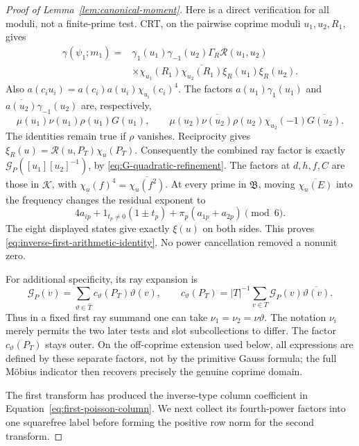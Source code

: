 \documentclass[12pt]{article}
\begin{document}
\begin{proof}[Proof of Lemma~\ref{lem:canonical-moment}]
Here is a direct verification for all moduli, not a finite-prime test.
CRT, on the pairwise coprime moduli \(u_1,u_2,R_1\), gives
\[
\begin{split}
 \gamma(\psi_1;m_1)
 ={}&\gamma_1(u_1)\gamma_{-1}(u_2)\Gamma_R
       \mathcal R(u_1,u_2)\\
 &\times\chi_{u_1}(R_1)\overline{\chi_{u_2}(R_1)}
             \xi_R(u_1)\xi_R(u_2).
\end{split}
\]
Also
\(a(c_i u_i)=a(c_i)a(u_i)\chi_{u_i}(c_i)^4\).
The factors
\(a(u_1)\gamma_1(u_1)\) and
\(\overline{a(u_2)}\gamma_{-1}(u_2)\) are, respectively,
\[
 \mu(u_1)\nu(u_1)\rho(u_1)G(u_1),\qquad
 \mu(u_2)\overline{\nu(u_2)}\rho(u_2)
                \chi_{u_2}(-1)\overline{G(u_2)}.
\]
The identities remain true if \(\rho\) vanishes.
Reciprocity gives
\(\xi_R(u)=\mathcal R(u,P_T)\chi_u(P_T)\).
Consequently the combined ray factor is exactly
\(\mathcal G_P([u_1][u_2]^{-1})\), by
\eqref{eq:G-quadratic-refinement}.
The factors at \(d,h,f,C\) are those in \(\mathcal K\), with
\(\chi_u(f)^4=\overline{\chi_u(f^2)}\).
At every prime in \(\mathfrak B\), moving
\(\overline{\chi_u(E)}\) into the frequency changes the residual
exponent to
\[
 4a_{ip}+1_{t_p\ne0}(1\mathbin{\pm}t_p)
                       +\pi_p(a_{1p}+a_{2p})\pmod6.
\]
The eight displayed states give exactly \(\xi(u)\) on both sides.
This proves \eqref{eq:inverse-first-arithmetic-identity}.
No power cancellation removed a nonunit zero.

For additional specificity, its ray expansion is
\[
 \mathcal G_P(v)=\sum_{\vartheta\in\widehat T}
          c_\vartheta(P_T)\vartheta(v),\qquad
 c_\vartheta(P_T)=|T|^{-1}\sum_{v\in T}
                 \mathcal G_P(v)\overline{\vartheta(v)} .
\]
Thus in a fixed first ray summand one can take
\(\nu_1=\nu_2=\nu\vartheta\).  The notation \(\nu_i\) merely permits
the two later tests and slot subcollections to differ.  The factor
\(c_\vartheta(P_T)\) stays outer.  On the off-coprime extension used
below, all expressions are defined by these separate factors, not
by the primitive Gauss formula; the full M\"obius indicator then
recovers precisely the genuine coprime domain.

The first transform has produced the inverse-type column coefficient
in Equation~\eqref{eq:first-poisson-column}.  We next collect its
fourth-power factors into one squarefree label before forming the
positive row norm for the second transform.


\end{proof}
\end{document}
